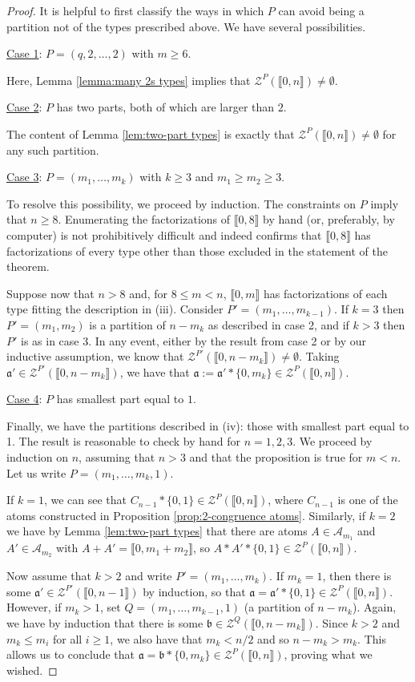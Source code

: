 \documentclass{report}
\newcommand{\A}{\mathcal{A}}
\renewcommand{\aa}{\mathfrak{a}}
\newcommand{\bb}{\mathfrak{b}}
\newcommand{\Z}{\mathcal{Z}}
\newcommand{\llb}{\llbracket}
\newcommand{\rrb}{\rrbracket}
\renewcommand{\:}{\text{:}}
\theoremstyle{definition}
\begin{document}
\begin{proof}
	It is helpful to first classify the ways in which $P$ can avoid being a partition not of the types prescribed above.  
	We have several possibilities.
	
	
	\underline{Case 1}: $P = (q,2,\dots, 2)$ with $m\ge 6$.
	
	Here, Lemma \ref{lemma:many 2s types} implies that $\Z^P(\llb 0,n \rrb) \neq \emptyset$.
	
	\underline{Case 2}: $P$ has two parts, both of which are larger than $2$.
	
	The content of Lemma \ref{lem:two-part types} is exactly that $\Z^P(\llb 0,n \rrb) \neq \emptyset$ for any such partition.
	
	\underline{Case 3}: $P = (m_1,\dots, m_k)$ with $k\ge 3$ and $m_1\ge m_2 \ge 3$.
	
	To resolve this possibility, we proceed by induction.
	The constraints on $P$ imply that $n\ge 8$.  
	Enumerating the factorizations of $\llb 0,8 \rrb$ by hand (or, preferably, by computer) is not prohibitively difficult and indeed confirms that $\llb 0,8 \rrb$ has factorizations of every type other than those excluded in the statement of the theorem.
	
	Suppose now that $n > 8$ and, for $8\le m < n$, $\llb 0,m \rrb$ has factorizations of each type fitting the description in (iii).
	Consider $P' = (m_1,\dots, m_{k-1})$.
	If $k=3$ then $P'=(m_1,m_2)$ is a partition of $n-m_k$ as described in case 2, and if $k>3$ then $P'$ is as in case 3.  
	In any event, either by the result from case 2 or by our inductive assumption, we know that $\Z^{P'}(\llb 0,n-m_k \rrb) \neq \emptyset$.
	Taking $\aa' \in \Z^{P'}(\llb 0,n-m_k \rrb)$, we have that $\aa := \aa' * \{0,m_k\} \in \Z^P(\llb 0,n \rrb)$.
	
	\underline{Case 4}: $P$ has smallest part equal to $1$.
	
	Finally, we have the partitions described in (iv): those with smallest part equal to 1.
	The result is reasonable to check by hand for $n=1,2,3$.
	We proceed by induction on $n$, assuming that $n>3$ and that the proposition is true for $m<n$.
	Let us write $P = (m_1,\dots, m_k, 1)$.
	
	If $k=1$, we can see that $C_{n-1}*\{0,1\}\in \Z^P(\llb 0,n \rrb)$, where $C_{n-1}$ is one of the atoms constructed in Proposition \ref{prop:2-congruence atoms}.
	Similarly, if $k=2$ we have by Lemma \ref{lem:two-part types} that there are atoms $A\in \A_{m_1}$ and $A'\in \A_{m_2}$ with $A+A' = \llb 0,m_1+m_2 \rrb$, so $A*A'* \{0,1\}\in \Z^P(\llb 0,n \rrb)$.
	
	Now assume that $k>2$ and write $P' = (m_1,\dots, m_k)$.
	If $m_k=1$, then there is some $\aa'\in \Z^{P'}(\llb 0,n-1 \rrb)$ by induction, so that $\aa = \aa' * \{0,1\}\in \Z^P(\llb 0,n \rrb)$.
	However, if $m_k > 1$, set $Q = (m_1,\dots, m_{k-1}, 1)$ (a partition of $n-m_k$).
	Again, we have by induction that there is some $\bb \in \Z^Q(\llb 0, n-m_k \rrb)$.
	Since $k>2$ and $m_k \le m_i$ for all $i\ge 1$, we also have that $m_k < n/2$ and so $n-m_k > m_k$.
	This allows us to conclude that $\aa = \bb * \{0,m_k\} \in \Z^P(\llb 0,n \rrb)$, proving what we wished.
\end{proof}
\end{document}
